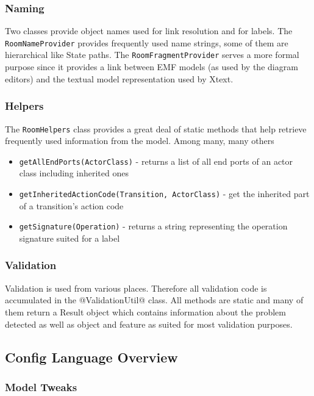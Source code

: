 \subsubsection{Naming}

Two classes provide object names used for link resolution and for labels.
The \texttt{RoomNameProvider} provides frequently used name strings, some of them are hierarchical like State paths.
The \texttt{RoomFragmentProvider} serves a more formal purpose since it provides a link between EMF models (as used by the diagram editors) and the textual model representation used by Xtext.

\subsubsection{Helpers}

The \texttt{RoomHelpers} class provides a great deal of static methods that help retrieve frequently used information from the model.
Among many, many others
\begin{itemize}
\item \texttt{getAllEndPorts(ActorClass)} - returns a list of all end ports of an actor class including inherited ones
\item \texttt{getInheritedActionCode(Transition, ActorClass)} - get the inherited part of a transition's action code
\item \texttt{getSignature(Operation)} - returns a string representing the operation signature suited for a label
\end{itemize}

\subsubsection{Validation}

Validation is used from various places. Therefore all validation code is accumulated in the @ValidationUtil@ class. All methods are static and many of them return a Result object which contains information about the problem detected as well as object and feature as suited for most validation purposes.

\subsection{Config Language Overview}

\subsubsection{Model Tweaks}

